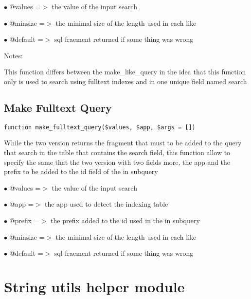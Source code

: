 \documentclass[a4paper]{book}
\begin{document}
\begin{compactitem}
\item[\color{myblue}$\bullet$] @values  =$>$ the value of the input search
\item[\color{myblue}$\bullet$] @minsize =$>$ the minimal size of the length used in each like
\item[\color{myblue}$\bullet$] @default =$>$ sql fraement returned if some thing was wrong
\end{compactitem}

Notes:

This function differs between the make\_like\_query in the idea that this
function only is used to search using fulltext indexes and in one unique
field named search

\hypertarget{toc264}{}
\subsection{Make Fulltext Query}

\begin{lstlisting}
function make_fulltext_query($values, $app, $args = [])
\end{lstlisting}

While the two version returns the fragment that must to be added to the
query that search in the table that contains the search field, this function
allow to specify the same that the two version with two fields more, the
app and the prefix to be added to the id field of the in subquery

\begin{compactitem}
\item[\color{myblue}$\bullet$] @values  =$>$ the value of the input search
\item[\color{myblue}$\bullet$] @app     =$>$ the app used to detect the indexing table
\item[\color{myblue}$\bullet$] @prefix  =$>$ the prefix added to the id used in the in subquery
\item[\color{myblue}$\bullet$] @minsize =$>$ the minimal size of the length used in each like
\item[\color{myblue}$\bullet$] @default =$>$ sql fraement returned if some thing was wrong
\end{compactitem}

\hypertarget{toc265}{}
\section{String utils helper module}
\end{document}
